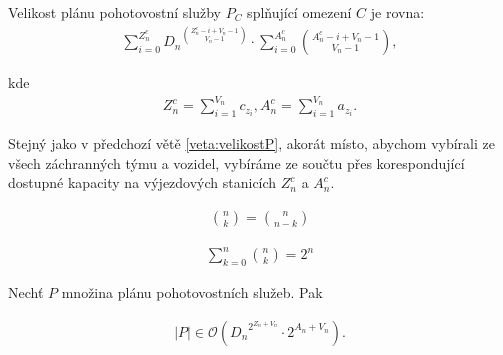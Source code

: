 \begin{veta}
  Velikost plánu pohotovostní služby $P_C$ splňující omezení $C$ je rovna:
  \begin{align*}
    \sum_{i=0}^{Z^c_n}{{D_n}^{\binom{Z^c_n - i + V_n - 1}{V_n - 1}}} \cdot \sum_{i = 0}^{A^c_n}\binom{A^c_n - i + V_n - 1}{V_n - 1},
  \end{align*}

  kde
  \begin{align*}
    Z^c_n = \sum_{i=1}^{V_n} c_{z_{i}}, A^c_n = \sum_{i=1}^{V_n} a_{z_{i}}.
  \end{align*}
\end{veta}

\begin{dukaz}
  Stejný jako v předchozí větě \ref{veta:velikostP}, akorát místo, abychom vybírali ze všech záchranných týmu a vozidel,
  vybíráme ze součtu přes korespondující dostupné kapacity na výjezdových stanicích $Z^c_n$ a $A^c_n$.
\end{dukaz}

\begin{lemma}\label{lemma:identitaKomb}
  \begin{align*}
    \binom{n}{k} = \binom{n}{n - k}
  \end{align*}
\end{lemma}

\begin{lemma}\label{lemma:sumaKomb}
  \begin{align*}
    \sum_{k=0}^n \binom{n}{k} = 2^n
  \end{align*}
\end{lemma}

\begin{veta}\label{veta:asymptotP}
  Nechť $P$ množina plánu pohotovostních služeb. Pak 

  \begin{align*}
    |P| \in \mathcal{O} \left ({D_n}^{2^{Z_n + V_n}} \cdot 2^{A_n + V_n} \right ).
  \end{align*}
\end{veta}

